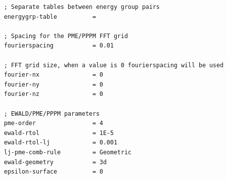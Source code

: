 \documentclass[11pt,twoside,a4paper]{report}
\begin{document}
\begin{appendices}
\begin{verbatim}
; Separate tables between energy group pairs
energygrp-table          = 

; Spacing for the PME/PPPM FFT grid
fourierspacing           = 0.01

; FFT grid size, when a value is 0 fourierspacing will be used
fourier-nx               = 0
fourier-ny               = 0
fourier-nz               = 0

; EWALD/PME/PPPM parameters
pme-order                = 4
ewald-rtol               = 1E-5
ewald-rtol-lj            = 0.001
lj-pme-comb-rule         = Geometric
ewald-geometry           = 3d
epsilon-surface          = 0

\end{verbatim}















\end{appendices}
\end{document}
